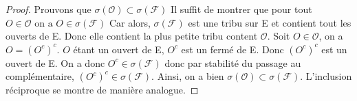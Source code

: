 \documentclass{article}[11pt]
\theoremstyle{definition}
\begin{document}
\begin{proof}
  Prouvons que $\sigma(\mathcal{O}) \subset \sigma(\mathcal{F})$
  Il suffit de montrer que pour tout $ O \in \mathcal{O} \text{ on a } O \in \sigma(\mathcal{F})$
  Car alors, $\sigma(\mathcal{F})$ est une tribu sur E et contient tout les ouverts de E. Donc elle contient la plus petite tribu content $\mathcal{O}$.\newline
  Soit $O \in \mathcal{O}$, on a $O = (O^c)^c$. \newline
  $O$ étant un ouvert de E, $O^c$ est un fermé de E. Donc $(O^c)^c$ est un ouvert de E.\newline
  On a donc $O^c \in \sigma(\mathcal{F})$ donc par stabilité du passage au complémentaire, $ (O^c)^c \in \sigma(\mathcal{F})$.\newline
  Ainsi, on a bien $\sigma(\mathcal{O}) \subset \sigma(\mathcal{F})$.
  L'inclusion réciproque se montre de manière analogue.
  
\end{proof}
\end{document}
